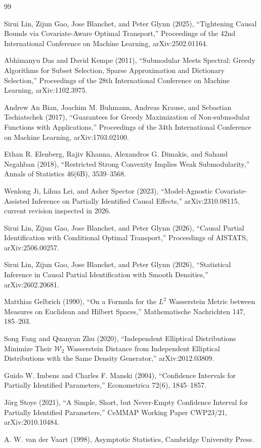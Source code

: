\documentclass{article}
\begin{document}
\begin{thebibliography}{99}

   Sirui Lin, Zijun Gao, Jose Blanchet, and Peter Glynn (2025), ``Tightening Causal Bounds via Covariate-Aware Optimal Transport,'' Proceedings of the 42nd International Conference on Machine Learning, arXiv:2502.01164.

   Abhimanyu Das and David Kempe (2011), ``Submodular Meets Spectral: Greedy Algorithms for Subset Selection, Sparse Approximation and Dictionary Selection,'' Proceedings of the 28th International Conference on Machine Learning, arXiv:1102.3975.

   Andrew An Bian, Joachim M. Buhmann, Andreas Krause, and Sebastian Tschiatschek (2017), ``Guarantees for Greedy Maximization of Non-submodular Functions with Applications,'' Proceedings of the 34th International Conference on Machine Learning, arXiv:1703.02100.

   Ethan R. Elenberg, Rajiv Khanna, Alexandros G. Dimakis, and Sahand Negahban (2018), ``Restricted Strong Convexity Implies Weak Submodularity,'' Annals of Statistics 46(6B), 3539--3568.

   Wenlong Ji, Lihua Lei, and Asher Spector (2023), ``Model-Agnostic Covariate-Assisted Inference on Partially Identified Causal Effects,'' arXiv:2310.08115, current revision inspected in 2026.

   Sirui Lin, Zijun Gao, Jose Blanchet, and Peter Glynn (2026), ``Causal Partial Identification with Conditional Optimal Transport,'' Proceedings of AISTATS, arXiv:2506.00257.

   Sirui Lin, Zijun Gao, Jose Blanchet, and Peter Glynn (2026), ``Statistical Inference in Causal Partial Identification with Smooth Densities,'' arXiv:2602.20681.

   Matthias Gelbrich (1990), ``On a Formula for the \(L^2\) Wasserstein Metric between Measures on Euclidean and Hilbert Spaces,'' Mathematische Nachrichten 147, 185--203.

   Song Fang and Quanyan Zhu (2020), “Independent Elliptical Distributions Minimize Their \(\mathcal W_2\) Wasserstein Distance from Independent Elliptical Distributions with the Same Density Generator,” arXiv:2012.03809.

   Guido W. Imbens and Charles F. Manski (2004), ``Confidence Intervals for Partially Identified Parameters,'' Econometrica 72(6), 1845--1857.

   Jörg Stoye (2021), ``A Simple, Short, but Never-Empty Confidence Interval for Partially Identified Parameters,'' CeMMAP Working Paper CWP23/21, arXiv:2010.10484.

   A. W. van der Vaart (1998), Asymptotic Statistics, Cambridge University Press.

\end{thebibliography}
\end{document}
